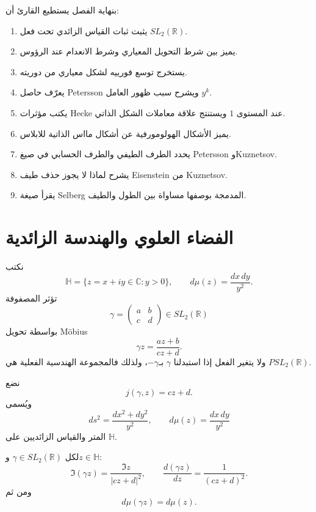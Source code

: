 بنهاية الفصل يستطيع القارئ أن:
\begin{enumerate}
  \item يثبت ثبات القياس الزائدي تحت فعل \(SL_2(\mathbb R)\).
  \item يميز بين شرط التحويل المعياري وشرط الانعدام عند الرؤوس.
  \item يستخرج توسع فورييه لشكل معياري من دوريته.
  \item يعرّف حاصل Petersson ويشرح سبب ظهور العامل \(y^k\).
  \item يكتب مؤثرات Hecke عند المستوى \(1\) ويستنتج علاقة معاملات الشكل الذاتي.
  \item يميز الأشكال الهولومورفية عن أشكال مااس الذاتية للابلاس.
  \item يحدد الطرف الطيفي والطرف الحسابي في صيغ Petersson وKuznetsov.
  \item يشرح لماذا لا يجوز حذف طيف Eisenstein من Kuznetsov.
  \item يقرأ صيغة Selberg المدمجة بوصفها مساواة بين الطول والطيف.
\end{enumerate}

\section{الفضاء العلوي والهندسة الزائدية}

نكتب
\[
\mathbb H=\{z=x+iy\in\mathbb C:y>0\},
\qquad
d\mu(z)=\frac{dx\,dy}{y^2}.
\]
تؤثر المصفوفة
\[
\gamma=
\begin{pmatrix}a&b\\c&d\end{pmatrix}
\in SL_2(\mathbb R)
\]
بواسطة تحويل Möbius
\[
\gamma z=\frac{az+b}{cz+d}.
\]
ولا يتغير الفعل إذا استبدلنا \(\gamma\) بـ\(-\gamma\)، ولذلك فالمجموعة
الهندسية الفعلية هي \(PSL_2(\mathbb R)\).

\begin{definition}
\label{def:automorphy-factor-hyperbolic-measure}
\provedhere
نضع
\[
j(\gamma,z)=cz+d.
\]
ويُسمى
\[
ds^2=\frac{dx^2+dy^2}{y^2},
\qquad
d\mu(z)=\frac{dx\,dy}{y^2}
\]
المتر والقياس الزائديين على \(\mathbb H\).
\end{definition}

\begin{proposition}
\label{prop:hyperbolic-invariance}
\provedhere
لكل \(\gamma\in SL_2(\mathbb R)\) و\(z\in\mathbb H\):
\[
\Im(\gamma z)=\frac{\Im z}{|cz+d|^2},
\qquad
\frac{d(\gamma z)}{dz}=\frac1{(cz+d)^2}.
\]
ومن ثم
\[
d\mu(\gamma z)=d\mu(z).
\]
\end{proposition}

